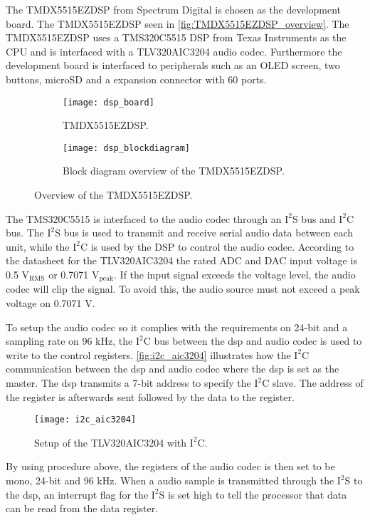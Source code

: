 The TMDX5515EZDSP from Spectrum Digital is chosen as the development board. The TMDX5515EZDSP seen in \autoref{fig:TMDX5515EZDSP_overview}. The TMDX5515EZDSP uses a TMS320C5515 DSP from Texas Instruments as the CPU and is interfaced with a TLV320AIC3204 audio codec. Furthermore the development board is interfaced to peripherals such as an OLED screen, two buttons, microSD and a expansion connector with 60 ports. 

\begin{figure}[H]
\centering
\begin{subfigure}[t]{0.47\textwidth}
\texttt{[image: dsp\_board]}
	\caption{TMDX5515EZDSP.}
	\label{fig:TMDX5515EZDSP}
\end{subfigure}
\hspace{6mm} 
\begin{subfigure}[t]{0.35\textwidth}
\texttt{[image: dsp\_blockdiagram]}
	\caption{Block diagram overview of the TMDX5515EZDSP.}
	\label{fig:TMDX5515EZDSP_blockdiagram}
\end{subfigure}
\caption{Overview of the TMDX5515EZDSP.}
\label{fig:TMDX5515EZDSP_overview}
\end{figure}

The TMS320C5515 is interfaced to the audio codec through an $\text{I}^2$S bus and $\text{I}^2$C bus. The $\text{I}^2$S bus is used to transmit and receive serial audio data between each unit, while the $\text{I}^2$C is used by the DSP to control the audio codec. According to the datasheet for the TLV320AIC3204 the rated ADC and DAC input voltage is 0.5 $\text{V}_\text{RMS}$ or 0.7071 $\text{V}_\text{peak}$. If the input signal exceeds the voltage level, the audio codec will clip the signal. To avoid this, the audio source must not exceed a peak voltage on 0.7071 V.

To setup the audio codec so it complies with the requirements on 24-bit and a sampling rate on 96 kHz, the $\text{I}^2$C bus between the dsp and audio codec is used to write to the control registers. \autoref{fig:i2c_aic3204} illustrates how the $\text{I}^2$C communication between the dsp and audio codec where the dsp is set as the master. The dsp transmits a 7-bit address to specify the $\text{I}^2$C slave. The address of the register is afterwards sent followed by the data to the register. 

\begin{figure}[H]
\centering
\texttt{[image: i2c\_aic3204]}
\caption{Setup of the TLV320AIC3204 with $\text{I}^2$C.}
\label{fig:i2c_aic3204}
\end{figure}  

By using procedure above, the registers of the audio codec is then set to be mono, 24-bit and 96 kHz. When a audio sample is transmitted through the $\text{I}^2$S to the dsp, an interrupt flag for the $\text{I}^2$S is set high to tell the processor that data can be read from the data register.








